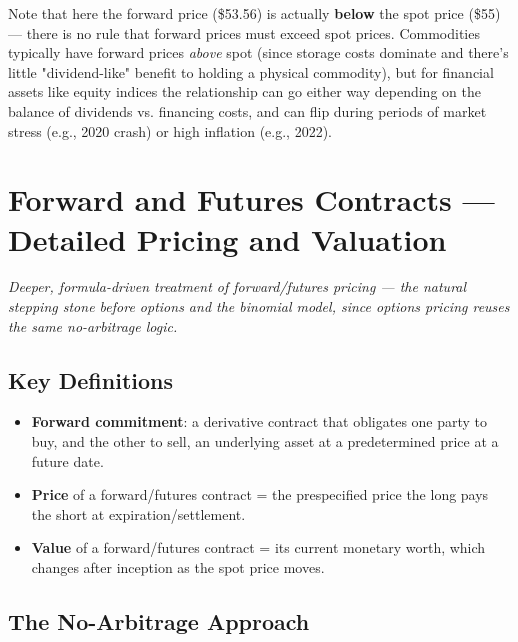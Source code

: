 \documentclass[12pt,openany]{book}
\theoremstyle{definition}
\theoremstyle{remark}
\begin{document}
Note that here the forward price (\$53.56) is actually \textbf{below} the spot price (\$55) — there is no rule that forward prices must exceed spot prices. Commodities typically have forward prices \emph{above} spot (since storage costs dominate and there's little "dividend-like" benefit to holding a physical commodity), but for financial assets like equity indices the relationship can go either way depending on the balance of dividends vs. financing costs, and can flip during periods of market stress (e.g., 2020 crash) or high inflation (e.g., 2022).


\section{Forward and Futures Contracts — Detailed Pricing and Valuation}

\emph{Deeper, formula-driven treatment of forward/futures pricing — the natural stepping stone before options and the binomial model, since options pricing reuses the same no-arbitrage logic.}

\subsection{Key Definitions}

\begin{itemize}
\item \textbf{Forward commitment}: a derivative contract that obligates one party to buy, and the other to sell, an underlying asset at a predetermined price at a future date.
\item \textbf{Price} of a forward/futures contract = the prespecified price the long pays the short at expiration/settlement.
\item \textbf{Value} of a forward/futures contract = its current monetary worth, which changes after inception as the spot price moves.
\end{itemize}
\subsection{The No-Arbitrage Approach}
\end{document}
